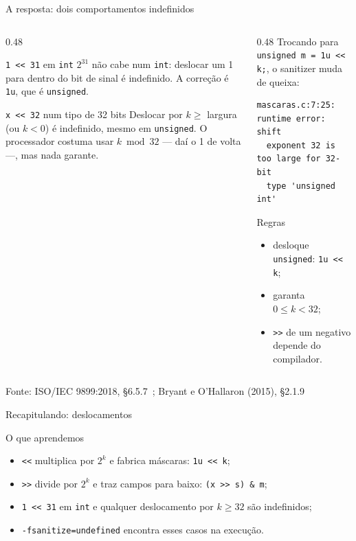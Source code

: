 \documentclass[aspectratio=169]{beamer}
\newcommand{\fonte}[1]{\vfill\hfill{\scriptsize\textcolor{UFSGray}{Fonte: #1}}}
\begin{document}
\begin{frame}[fragile]{A resposta: dois comportamentos indefinidos}
  \begin{columns}[T]
    \begin{column}{0.48\textwidth}
      \begin{block}{\texttt{1 <{}< 31} em \texttt{int}}
        \small $2^{31}$ não cabe num \texttt{int}: deslocar um 1 para dentro
        do bit de sinal é indefinido. A correção é \texttt{1u}, que é
        \texttt{unsigned}.
      \end{block}
      \begin{block}{\texttt{x <{}< 32} num tipo de 32 bits}
        \small Deslocar por $k \geq$ largura (ou $k < 0$) é indefinido, mesmo
        em \texttt{unsigned}. O processador costuma usar $k \bmod 32$ --- daí
        o 1 de volta ---, mas nada garante.
      \end{block}
    \end{column}
    \begin{column}{0.48\textwidth}
      \small Trocando para \texttt{unsigned m = 1u <{}< k;}, o sanitizer muda
      de queixa:
\begin{lstlisting}[style=shellStyle]
mascaras.c:7:25: runtime error: shift
  exponent 32 is too large for 32-bit
  type 'unsigned int'
\end{lstlisting}
      \begin{block}{Regras}
        \small
        \begin{itemize}
          \item desloque \texttt{unsigned}: \texttt{1u <{}< k};
          \item garanta $0 \leq k < 32$;
          \item \texttt{>{}>} de um negativo depende do compilador.
        \end{itemize}
      \end{block}
    \end{column}
  \end{columns}
  \fonte{ISO/IEC 9899:2018, §6.5.7~\cite{iso2018c17};
    Bryant e O'Hallaron (2015), §2.1.9~\cite{bryant2015computer}}
\end{frame}

\begin{frame}{Recapitulando: deslocamentos}
  \begin{block}{O que aprendemos}
    \begin{itemize}
      \item \texttt{<{}<} multiplica por $2^k$ e fabrica máscaras:
        \texttt{1u <{}< k};
      \item \texttt{>{}>} divide por $2^k$ e traz campos para baixo:
        \texttt{(x >{}> s) \& m};
      \item \texttt{1 <{}< 31} em \texttt{int} e qualquer deslocamento por
        $k \geq 32$ são indefinidos;
      \item \texttt{-fsanitize=undefined} encontra esses casos na execução.
    \end{itemize}
  \end{block}
\end{frame}
\end{document}
